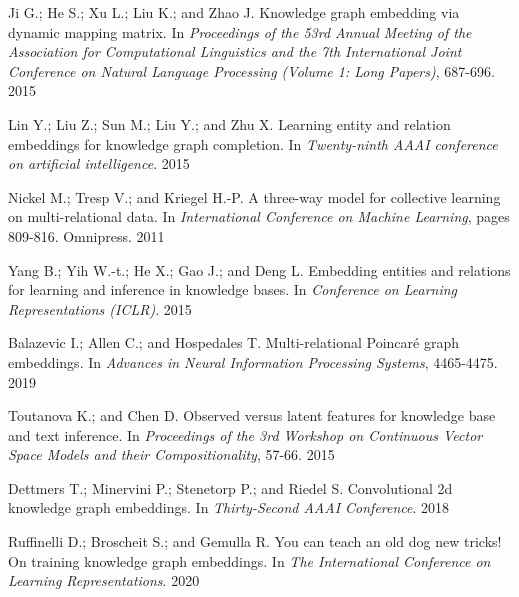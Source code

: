 \documentclass[11pt]{article}
\begin{document}
\hypertarget{Jie15}{Ji G.; He S.; Xu L.; Liu K.; and Zhao J. Knowledge graph embedding via dynamic mapping matrix. In \textit{Proceedings of the 53rd Annual Meeting of the Association for Computational Linguistics and the 7th International Joint Conference on Natural Language Processing (Volume 1: Long Papers)}, 687-696. 2015} 

\hypertarget{Lin15}{Lin Y.; Liu Z.; Sun M.; Liu Y.; and Zhu X. Learning entity and relation embeddings for knowledge graph completion. In \textit{Twenty-ninth AAAI conference on artificial intelligence}. 2015} 

\hypertarget{Nic11}{Nickel M.; Tresp V.; and Kriegel H.-P. A three-way model for collective learning on multi-relational data. In \textit{International Conference on Machine Learning}, pages 809-816. Omnipress. 2011} 

\hypertarget{Yan15}{Yang B.; Yih W.-t.; He X.; Gao J.; and Deng L. Embedding entities and relations for learning and inference in knowledge bases. In \textit{Conference on Learning Representations (ICLR)}. 2015} 

\hypertarget{Bal19}{Balazevic I.; Allen C.; and Hospedales T. Multi-relational Poincaré graph embeddings. In \textit{Advances in Neural Information Processing Systems}, 4465-4475. 2019} 

\hypertarget{Tou15}{Toutanova K.; and Chen D. Observed versus latent features for knowledge base and text inference. In \textit{Proceedings of the 3rd Workshop on Continuous Vector Space Models and their Compositionality}, 57-66. 2015}

\hypertarget{Det18}{Dettmers T.; Minervini P.; Stenetorp P.; and Riedel S. Convolutional 2d knowledge graph embeddings. In \textit{Thirty-Second AAAI Conference}. 2018}

\hypertarget{Ruf20}{Ruffinelli D.; Broscheit S.; and Gemulla R. You can teach an old dog new tricks! On training knowledge graph embeddings. In \textit{The International Conference on Learning Representations}. 2020}



\end{document}
